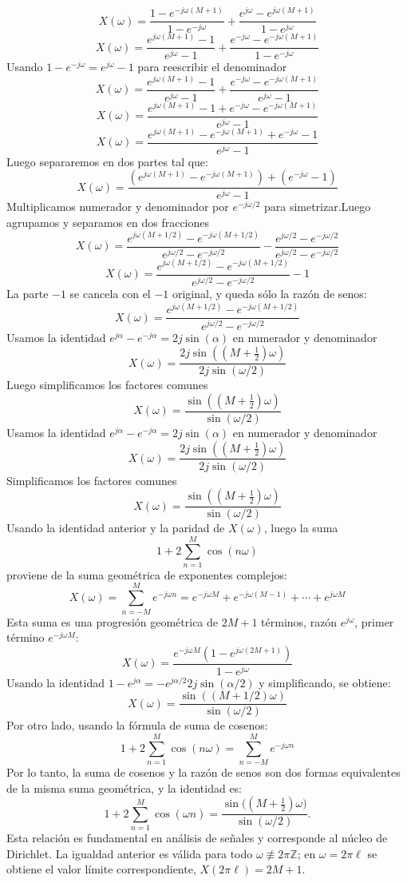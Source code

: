 \documentclass[
  11pt,
  letterpaper,
   addpoints,
   answers
  ]{exam}
\begin{document}
\begin{questions}
\begin{solution}
\[
X(\omega) = \frac{1-e^{-j\omega(M+1)}}{1-e^{-j\omega}} + \frac{e^{j\omega}-e^{j\omega(M+1)}}{1-e^{j\omega}}
\]
\[
X(\omega) = \frac{e^{j\omega(M+1)}-1}{e^{j\omega}-1} + \frac{e^{-j\omega}-e^{-j\omega(M+1)}}{1-e^{-j\omega}}
\]
Usando $1-e^{-j\omega} = e^{j\omega}-1$ para reescribir el denominador
\[
X(\omega) = \frac{e^{j\omega(M+1)}-1}{e^{j\omega}-1} + \frac{e^{-j\omega}-e^{-j\omega(M+1)}}{e^{j\omega}-1}
\]
\[
X(\omega) = \frac{e^{j\omega(M+1)}-1 + e^{-j\omega}-e^{-j\omega(M+1)}}{e^{j\omega}-1}
\]
\[
X(\omega) = \frac{e^{j\omega(M+1)}-e^{-j\omega(M+1)} + e^{-j\omega}-1}{e^{j\omega}-1}
\]
Luego separaremos en dos partes tal que:
\[
X(\omega) = \frac{\left(e^{j\omega(M+1)}-e^{-j\omega(M+1)}\right) + \left(e^{-j\omega}-1\right)}{e^{j\omega}-1}
\]
Multiplicamos numerador y denominador por $e^{-j\omega/2}$ para simetrizar.Luego agrupamos y separamos en dos fracciones
\[
X(\omega) = \frac{e^{j\omega(M+1/2)} - e^{-j\omega(M+1/2)}}{e^{j\omega/2} - e^{-j\omega/2}} - \frac{e^{j\omega/2} - e^{-j\omega/2}}{e^{j\omega/2} - e^{-j\omega/2}}
\]
\[
X(\omega) = \frac{e^{j\omega(M+1/2)} - e^{-j\omega(M+1/2)}}{e^{j\omega/2} - e^{-j\omega/2}} - 1
\]
La parte $-1$ se cancela con el $-1$ original, y queda sólo la razón de senos:
\[
X(\omega) = \frac{e^{j\omega(M+1/2)} - e^{-j\omega(M+1/2)}}{e^{j\omega/2} - e^{-j\omega/2}}
\]
Usamos la identidad $e^{j\alpha}-e^{-j\alpha}=2j\sin(\alpha)$ en numerador y denominador
\[
X(\omega) = \frac{2j\sin\left((M+\tfrac{1}{2})\omega\right)}{2j\sin(\omega/2)}
\]
Luego simplificamos los factores comunes
\[
X(\omega) = \frac{\sin\left((M+\tfrac{1}{2})\omega\right)}{\sin(\omega/2)}
\]
Usamos la identidad $e^{j\alpha}-e^{-j\alpha}=2j\sin(\alpha)$ en numerador y denominador
\[
X(\omega) = \frac{2j\sin\left((M+\tfrac{1}{2})\omega\right)}{2j\sin(\omega/2)}
\]
Simplificamos los factores comunes
\[
X(\omega) = \frac{\sin\left((M+\tfrac{1}{2})\omega\right)}{\sin(\omega/2)}
\]
Usando la identidad anterior y la paridad de $X(\omega)$, luego la suma
\[
1 + 2\sum_{n=1}^M \cos(n\omega)
\]
proviene de la suma geométrica de exponentes complejos:
\[
X(\omega) = \sum_{n=-M}^M e^{-j\omega n} = e^{-j\omega M} + e^{-j\omega(M-1)} + \cdots + e^{j\omega M}
\]
Esta suma es una progresión geométrica de $2M+1$ términos, razón $e^{j\omega}$, primer término $e^{-j\omega M}$:
\[
X(\omega) = \frac{e^{-j\omega M}(1 - e^{j\omega(2M+1)})}{1 - e^{j\omega}}
\]
Usando la identidad $1 - e^{j\alpha} = -e^{j\alpha/2}2j\sin(\alpha/2)$ y simplificando, se obtiene:
\[
X(\omega) = \frac{\sin((M+1/2)\omega)}{\sin(\omega/2)}
\]
Por otro lado, usando la fórmula de suma de cosenos:
\[
1 + 2\sum_{n=1}^M \cos(n\omega) = \sum_{n=-M}^M e^{-j\omega n}
\]
Por lo tanto, la suma de cosenos y la razón de senos son dos formas equivalentes de la misma suma geométrica, y la identidad es:
\[
\boxed{\;
1+2\sum_{n=1}^{M}\cos(\omega n)
=\frac{\sin\!\big((M+\tfrac12)\omega\big)}{\sin(\omega/2)}. \;}
\]
Esta relación es fundamental en análisis de señales y corresponde al núcleo de Dirichlet.
La igualdad anterior es válida para todo $\omega\not\equiv 2\pi\mathbb{Z}$; en $\omega=2\pi\ell$ se obtiene el valor límite correspondiente, $X(2\pi\ell)=2M+1$.


\end{solution}
\end{questions}
\end{document}
